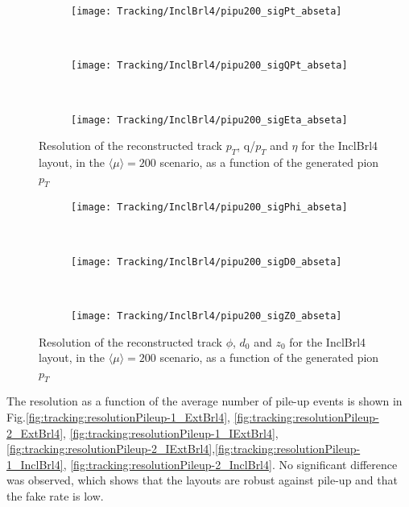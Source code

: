 \documentclass[a4paper,twoside,12pt]{book}
\begin{document}
\begin{figure}
\begin{subfigure}{\linewidth}
\centering
\texttt{[image: Tracking/InclBrl4/pipu200\_sigPt\_abseta]}
\caption{}
\label{fig:tracking:pipu200_sigPt_abseta}
\end{subfigure}\\[1ex]
\begin{subfigure}{\linewidth}
\centering
\texttt{[image: Tracking/InclBrl4/pipu200\_sigQPt\_abseta]}
\caption{}
\label{fig:tracking:pipu200_sigQPt_abseta}
\end{subfigure}\\[1ex]
\begin{subfigure}{\linewidth}
\centering
\texttt{[image: Tracking/InclBrl4/pipu200\_sigEta\_abseta]}
\caption{}
\label{fig:tracking:pipu200_sigEta_abseta}
\end{subfigure}
\caption{Resolution of the reconstructed track $p_{T}$, q/$p_{T}$ and $\eta$ for the InclBrl4 layout, in the $\langle\mu\rangle = 200$ scenario, as a function of the generated pion $p_{T}$}
\label{fig:tracking:pionPt-1}
\end{figure}

\begin{figure}
\begin{subfigure}{\linewidth}
\centering
\texttt{[image: Tracking/InclBrl4/pipu200\_sigPhi\_abseta]}
\caption{}
\label{fig:tracking:pipu200_sigPhi_abseta}
\end{subfigure}\\[1ex]
\begin{subfigure}{\linewidth}
\centering
\texttt{[image: Tracking/InclBrl4/pipu200\_sigD0\_abseta]}
\caption{}
\label{fig:tracking:pipu200_sigD0_abseta}
\end{subfigure}\\[1ex]
\begin{subfigure}{\linewidth}
\centering
\texttt{[image: Tracking/InclBrl4/pipu200\_sigZ0\_abseta]}
\caption{}
\label{fig:tracking:pipu200_sigZ0_abseta}
\end{subfigure}
\caption{Resolution of the reconstructed track $\phi$, $d_{0}$ and $z_{0}$ for the InclBrl4 layout, in the $\langle\mu\rangle = 200$ scenario, as a function of the generated pion $p_{T}$}
\label{fig:tracking:pionPt-2}
\end{figure}


The resolution as a function of the average number of pile-up events is shown in Fig.\ref{fig:tracking:resolutionPileup-1_ExtBrl4}, \ref{fig:tracking:resolutionPileup-2_ExtBrl4},
\ref{fig:tracking:resolutionPileup-1_IExtBrl4}, \ref{fig:tracking:resolutionPileup-2_IExtBrl4},\ref{fig:tracking:resolutionPileup-1_InclBrl4}, \ref{fig:tracking:resolutionPileup-2_InclBrl4}. No significant difference was observed, 
which shows that the layouts are robust against pile-up and that the fake rate is low.\\
\end{document}
